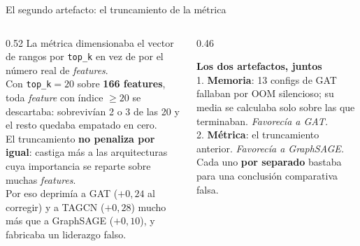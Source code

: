 \documentclass[aspectratio=169,10pt]{beamer}
\begin{document}
\begin{frame}{El segundo artefacto: el truncamiento de la métrica}
\begin{columns}[T]
\begin{column}{0.52\textwidth}
\footnotesize
La métrica dimensionaba el vector de rangos por \texttt{top\_k} en vez de por el número real de \textit{features}.\\[5pt]
Con \texttt{top\_k}$=20$ sobre \textbf{166 features}, toda \textit{feature} con índice $\geq 20$ se descartaba: sobrevivían 2 o 3 de las 20 y el resto quedaba empatado en cero.\\[6pt]
El truncamiento \textbf{no penaliza por igual}: castiga más a las arquitecturas cuya importancia se reparte sobre muchas \textit{features}.\\[4pt]
{\color{muted}Por eso deprimía a GAT ($+0{,}24$ al corregir) y a TAGCN ($+0{,}28$) mucho más que a GraphSAGE ($+0{,}10$), y fabricaba un liderazgo falso.}
\end{column}
\begin{column}{0.46\textwidth}
\begin{block}{}
\footnotesize
\textbf{Los dos artefactos, juntos}\\[4pt]
1. \textbf{Memoria}: 13 configs de GAT fallaban por OOM silencioso; su media se calculaba solo sobre las que terminaban. \textit{Favorecía a GAT.}\\[4pt]
2. \textbf{Métrica}: el truncamiento anterior. \textit{Favorecía a GraphSAGE.}\\[5pt]
Cada uno \textbf{por separado} bastaba para una conclusión comparativa falsa.
\end{block}
\end{column}
\end{columns}
\end{frame}
\end{document}
